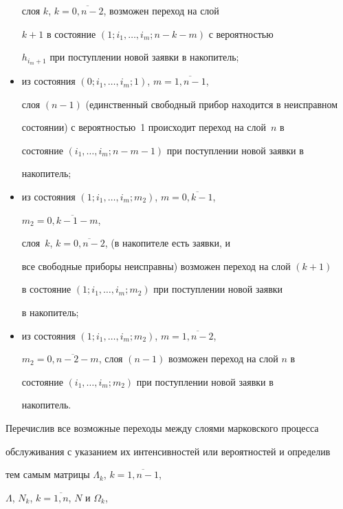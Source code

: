 \begin{multicols}{2}
\begin{itemize}
слоя $k$, $k=\overline{0,n-2}$, возможен переход на слой


$k+1$ в состояние $\left(1;i_1,\ldots,i_m;n-k-m\right)$ с вероятностью


$h_{i_m+1}$ при поступлении новой заявки в накопитель;


\item


из состояния $\left(0;i_1,\ldots,i_m;1\right)$, $m=\overline{1,n-1}$,


слоя $(n-1)$ (единственный свободный прибор находится в неисправном


состоянии) с ве\-ро\-ят\-ностью~1 происходит переход на слой~$n$ в


со\-сто\-яние $\left(i_1,\ldots,i_m;n-m-1\right)$ при поступлении новой заявки в


накопитель;


\item


из состояния $\left(1;i_1,\ldots,i_m;m_2\right)$, $m=\overline{0,k-1}$,


$m_2=\overline{0,k-1-m}$,


слоя~$k$, $k=\overline{0,n-2}$, (в накопителе есть заявки, и


все свободные приборы неисправны) возможен переход на слой $(k+1)$


в состояние $\left(1;i_1,\ldots,i_m;m_2\right)$ при поступлении новой заявки


в накопитель;


\item


из состояния $\left(1;i_1,\ldots,i_m;m_2\right)$, $m=\overline{1,n-2}$,


$m_2=\overline{0,n-2-m}$, слоя $(n-1)$ возможен переход на слой $n$ в


состояние $\left(i_1,\ldots,i_m;m_2\right)$ при поступлении новой заявки в


накопитель.


\end{itemize}





Перечислив все возможные переходы между слоями марковского процесса


обслуживания с указанием их интенсивностей или вероятностей и определив


тем самым матрицы $\Lambda_k$, $k=\overline{1,n-1}$,


$\Lambda$, $N_k$, $k=\overline{1,n}$, $N$ и $\Omega_k$,



\end{multicols}
